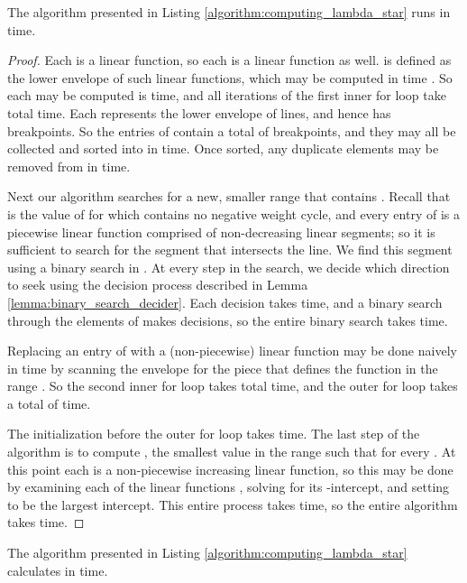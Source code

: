 \documentclass{llncs}
\begin{document}
\begin{lemma}
\label{lemma:lambda_star_time}
The algorithm presented in Listing \ref{algorithm:computing_lambda_star} runs in  time.
\end{lemma}

\begin{proof}
Each  is a linear function, so each  is a linear function as well.   is defined as the lower envelope of  such linear functions, which may be computed in  time \cite{textbook}.  So each  may be computed is  time, and all  iterations of the first inner for loop take  total time.  Each  represents the lower envelope of  lines, and hence has  breakpoints.  So the entries of  contain a total of  breakpoints, and they may all be collected and sorted into  in  time.  Once sorted, any duplicate elements may be removed from  in  time.

Next our algorithm searches for a new, smaller  range that contains .  Recall that  is the value of  for which  contains no negative weight cycle, and every entry of  is a piecewise linear function comprised of non-decreasing linear segments; so it is sufficient to search for the segment that intersects the  line.  We find this segment using a binary search in .  At every step in the search, we decide which direction to seek using the decision process described in Lemma \ref{lemma:binary_search_decider}.  Each decision takes  time, and a binary search through the  elements of  makes  decisions, so the entire binary search takes  time.

Replacing an entry of  with a (non-piecewise) linear function may be done naively in  time by scanning the envelope for the piece that defines the function in the range .  So the second inner for loop takes  total time, and the outer for loop takes a total of  time.

The initialization before the outer for loop takes  time.  The last step of the algorithm is to compute , the smallest value in the range  such that  for every .  At this point each  is a non-piecewise increasing linear function, so this may be done by examining each of the  linear functions , solving for its -intercept, and setting  to be the largest intercept.  This entire process takes  time, so the entire algorithm takes  time.
\end{proof}

\begin{theorem}
\label{theorem:lambda_star_algorithm}
The algorithm presented in Listing \ref{algorithm:computing_lambda_star} calculates  in  time.
\end{theorem}
\end{document}

